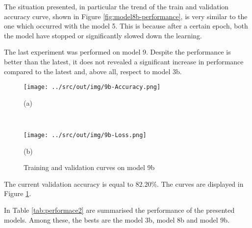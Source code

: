 \documentclass[a4paper,12pt]{article} %
\begin{document}
	The situation presented, in particular the trend of the train and 
	validation accuracy curve, shown in Figure \ref{fig:model8b-performance}, 
	is very similar to the one which occurred with the model 5. This is because 
	after a certain epoch, both the model have stopped or significantly slowed 
	down the learning.
	\newline

	The last experiment was performed on model 9. Despite the performance is 
	better than the latest, it does not revealed a significant increase in 
	performance compared to the latest and, above all, respect to model 3b. 
			
	\begin{figure}[htb]
		\begin{minipage}[c]{.49\textwidth}
			\centering
			\texttt{[image: ../src/out/img/9b-Accuracy.png]}
			\caption*{(a)}
		\end{minipage}
		~
		\begin{minipage}[c]{.49\textwidth}
			\centering
			\texttt{[image: ../src/out/img/9b-Loss.png]}
			\caption*{(b)}
		\end{minipage}
		\caption{Training and validation curves on model 9b}
		\label{fig:model9b-performance}
	\end{figure}
	
	The current validation accuracy is equal to $82.20\%$.
	The curves are displayed in Figure \ref{fig:model9b-performance}.
	\newline

	In Table \ref{tab:performace2} are summarised the performance of the 
	presented models. Among these, the bests are the model 3b, 
	model 8b and model 9b. 
\end{document}
